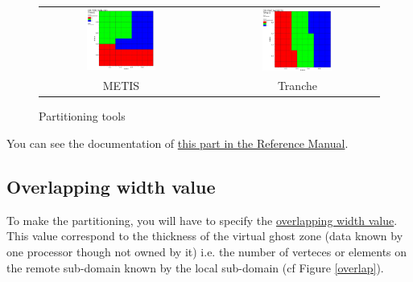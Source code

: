 \begin{figure}[h!]
\begin{centering}
\begin{tabular}{ccc}
\includegraphics[width=0.45\textwidth]{partition_metis.jpeg} & & \includegraphics[width=0.45\textwidth]{partition_tranche.jpeg}\tabularnewline
METIS & & Tranche\tabularnewline
\end{tabular}
\par\end{centering}
\caption{Partitioning tools}
\label{partitioning}
\end{figure}

You can see the documentation of \href{../../Outils/TRIOXDATA/XTriou/doc.pdf\#partition}{this part in the \trust Reference Manual}.



\subsection{Overlapping width value}
To make the partitioning, you will have to specify the \underline{overlapping width value}.
This value correspond to the thickness of the virtual ghost zone (data known by one processor though not owned by it) i.e. the number of verteces or elements on the remote sub-domain known by the local sub-domain (cf Figure \ref{overlap}).


